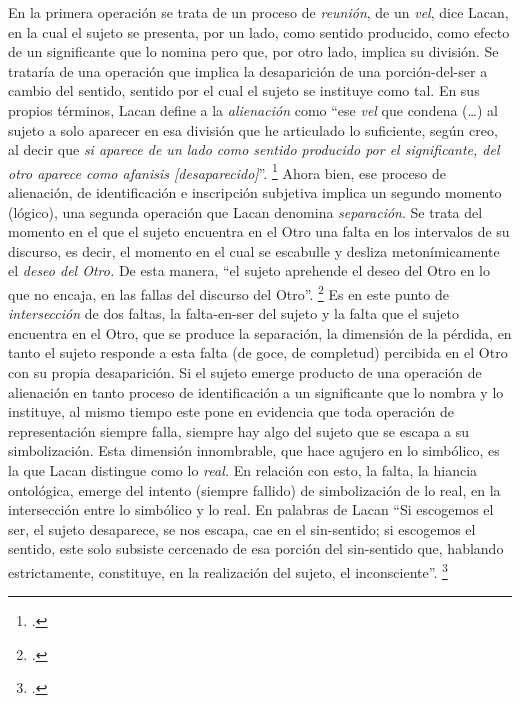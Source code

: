 En la primera operación se trata de un proceso de \emph{reunión}, de un \emph{vel}, dice Lacan, en la cual el sujeto se presenta, por un lado, como sentido producido, como efecto de un significante que lo nomina pero que, por otro lado, implica su división. Se trataría de una operación que implica la desaparición de una porción-del-ser a cambio del sentido, sentido por el cual el sujeto se instituye como tal. En sus propios términos, Lacan define a la \emph{alienación} como \enquote{ese \emph{vel} que condena (\ldots) al sujeto a solo aparecer en esa división que he articulado lo suficiente, según creo, al decir que \emph{si aparece de un lado como sentido producido por el significante, del otro aparece como afanisis [desaparecido]}}. \footcite[][218]{@7106-LACAN2006} Ahora bien, ese proceso de alienación, de identificación e inscripción subjetiva implica un segundo momento (lógico), una segunda operación que Lacan denomina \emph{separación}. Se trata del momento en el que el sujeto encuentra en el Otro una falta en los intervalos de su discurso, es decir, el momento en el cual se escabulle y desliza metonímicamente el \emph{deseo del Otro.} De esta manera, \enquote{el sujeto aprehende el deseo del Otro en lo que no encaja, en las fallas del discurso del Otro}. \footcite[][222]{@7106-LACAN2006} Es en este punto de \emph{intersección} de dos faltas, la falta-en-ser del sujeto y la falta que el sujeto encuentra en el Otro, que se produce la separación, la dimensión de la pérdida, en tanto el sujeto responde a esta falta (de goce, de completud) percibida en el Otro con su propia desaparición. Si el sujeto emerge producto de una operación de alienación en tanto proceso de identificación a un significante que lo nombra y lo instituye, al mismo tiempo este pone en evidencia que toda operación de representación siempre falla, siempre hay algo del sujeto que se escapa a su simbolización. Esta dimensión innombrable, que hace agujero en lo simbólico, es la que Lacan distingue como lo \emph{real.} En relación con esto, la falta, la hiancia ontológica, emerge del intento (siempre fallido) de simbolización de lo real, en la intersección entre lo simbólico y lo real. En palabras de Lacan \enquote{Si escogemos el ser, el sujeto desaparece, se nos escapa, cae en el sin-sentido; si escogemos el sentido, este solo subsiste cercenado de esa porción del sin-sentido que, hablando estrictamente, constituye, en la realización del sujeto, el inconsciente}. \footcite[][219]{@7106-LACAN2006}

